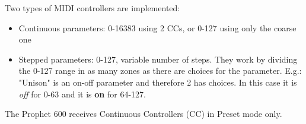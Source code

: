 Two types of MIDI controllers are implemented:

\begin{itemize}
  \setlength\itemsep{0cm}
  \item Continuous parameters: 0-16383 using 2 CCs, or 0-127 using only the coarse one
  \item Stepped parameters: 0-127, variable number of steps. They work by dividing the 0-127 range in as many zones as there are choices for the parameter. E.g.: "Unison" is an on-off parameter and therefore 2 has choices. In this case it is \textit{off} for 0-63 and it is \textbf{on} for 64-127.
\end{itemize}

The Prophet 600 receives Continuous Controllers (CC) in Preset mode only. 

\footnotesize
\renewcommand{\arraystretch}{1.3}


